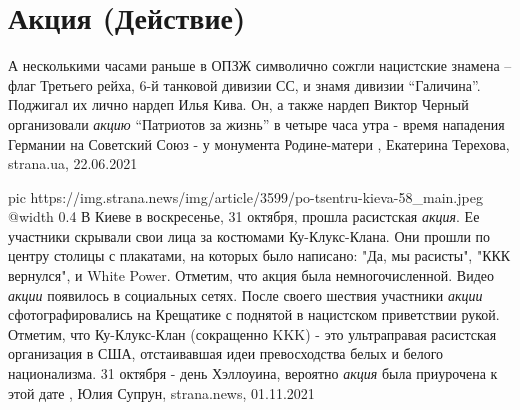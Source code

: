  
 
 
 
 
\chapter{Акция (Действие)}
\label{sec:slova.akcia.dejstvie}

А несколькими часами раньше в ОПЗЖ символично сожгли нацистские знамена – флаг
Третьего рейха, 6-й танковой дивизии СС, и знамя дивизии \enquote{Галичина}. Поджигал
их лично нардеп Илья Кива.  Он, а также нардеп Виктор Черный организовали \emph{акцию}
\enquote{Патриотов за жизнь} в четыре часа утра - время нападения Германии на Советский
Союз - у монумента Родине-матери
, Екатерина Терехова, strana.ua, 22.06.2021

\ifcmt
  pic https://img.strana.news/img/article/3599/po-tsentru-kieva-58_main.jpeg
  @width 0.4
\fi
В Киеве в воскресенье, 31 октября, прошла расистская \emph{акция}. Ее участники
скрывали свои лица за костюмами Ку-Клукс-Клана. Они прошли по центру столицы с
плакатами, на которых было написано: "Да, мы расисты", "ККК вернулся", и White
Power. Отметим, что акция была немногочисленной.  Видео \emph{акции} появилось
в социальных сетях.  После своего шествия участники \emph{акции}
сфотографировались на Крещатике с поднятой в нацистском приветствии рукой.
Отметим, что Ку-Клукс-Клан (сокращенно KKK) - это ультраправая расистская
организация в США, отстаивавшая идеи превосходства белых и белого национализма.
31 октября - день Хэллоуина, вероятно \emph{акция} была приурочена к этой дате
, 
Юлия Супрун, strana.news, 01.11.2021
